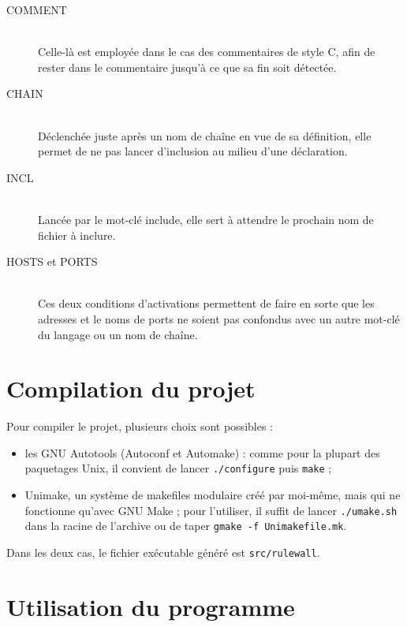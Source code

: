 \documentclass[a4paper,11pt]{report}
\begin{document}
\begin{description}
  \item[COMMENT]~\\
    Celle-là est employée dans le cas des commentaires de style C, afin de
    \og rester dans le commentaire\fg{} jusqu'à ce que sa fin soit détectée.

  \item[CHAIN]~\\
    Déclenchée juste après un nom de chaîne en vue de sa définition, elle
    permet de ne pas lancer d'inclusion au milieu d'une déclaration.

  \item[INCL]~\\
    Lancée par le mot-clé \og include\fg, elle sert à attendre le prochain nom
    de fichier à inclure.

  \item[HOSTS et PORTS]~\\
    Ces deux conditions d'activations permettent de faire en sorte que les
    adresses et le noms de ports ne soient pas confondus avec un autre mot-clé
    du langage ou un nom de chaîne.
\end{description}

\section{Compilation du projet}

Pour compiler le projet, plusieurs choix sont possibles :

\begin{itemize}
  \item les GNU Autotools (Autoconf et Automake) : comme pour la plupart des
    paquetages Unix, il convient de lancer \verb!./configure! puis
    \verb!make! ;
  \item Unimake, un système de makefiles modulaire créé par moi-même, mais qui
    ne fonctionne qu'avec GNU Make ; pour l'utiliser, il suffit de lancer
    \verb!./umake.sh! dans la racine de l'archive ou de taper
    \verb!gmake -f Unimakefile.mk!.
\end{itemize}

\bigskip
Dans les deux cas, le fichier exécutable généré est \verb!src/rulewall!.

\section{Utilisation du programme}
\end{document}
